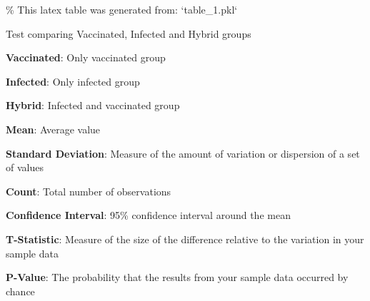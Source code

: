 \documentclass[11pt]{article}
\begin{document}
\begin{codeoutput}
\% This latex table was generated from: `table\_1.pkl`
\begin{table}[h]
\caption{Test of association between vaccination status and symptom numbers}
\label{table:association\_test}
\begin{threeparttable}
\renewcommand{\TPTminimum}{\linewidth}
\begin{tablenotes}
\footnotesize
\item Test comparing Vaccinated, Infected and Hybrid groups
\item \textbf{Vaccinated}: Only vaccinated group
\item \textbf{Infected}: Only infected group
\item \textbf{Hybrid}: Infected and vaccinated group
\item \textbf{Mean}: Average value
\item \textbf{Standard Deviation}: Measure of the amount of variation or dispersion of a set of values
\item \textbf{Count}: Total number of observations
\item \textbf{Confidence Interval}: 95\% confidence interval around the mean
\item \textbf{T-Statistic}: Measure of the size of the difference relative to the variation in your sample data
\item \textbf{P-Value}: The probability that the results from your sample data occurred by chance
\end{tablenotes}
\end{threeparttable}
\end{table}
\end{codeoutput}
\end{document}
